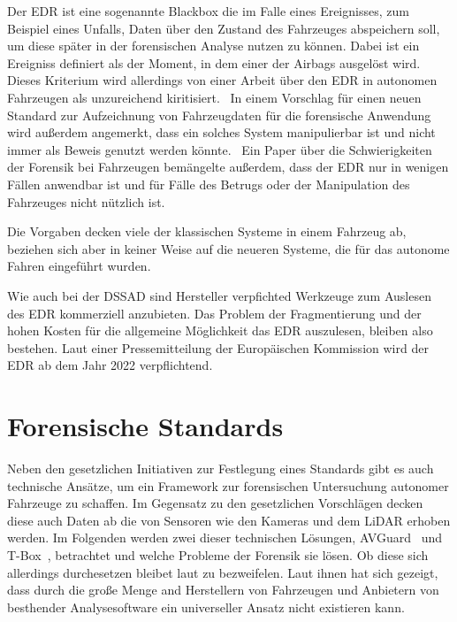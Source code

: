 \documentclass[conference,compsoc,final,a4paper]{IEEEtran}
\begin{document}
Der \ac{EDR} ist eine sogenannte Blackbox die im Falle eines Ereignisses, zum Beispiel eines Unfalls, Daten über den Zustand des Fahrzeuges abspeichern soll, um diese
später in der forensischen Analyse nutzen zu können.
Dabei ist ein Ereigniss definiert als der Moment, in dem einer der Airbags ausgelöst wird.~\cite{NHTSA_2018}
Dieses Kriterium wird allerdings von einer Arbeit über den EDR in autonomen Fahrzeugen als unzureichend kiritisiert.~\cite{Boehm2020}
In einem Vorschlag für einen neuen Standard zur Aufzeichnung von Fahrzeugdaten für die forensische Anwendung wird außerdem angemerkt,
dass ein solches System manipulierbar ist und nicht immer als Beweis genutzt werden könnte.~\cite{Lee_2019}
Ein Paper über die Schwierigkeiten der Forensik bei Fahrzeugen bemängelte außerdem, dass der \ac{EDR} nur in wenigen Fällen anwendbar ist
und für Fälle des Betrugs oder der Manipulation des Fahrzeuges nicht nützlich ist.~\cite{Kopencova_2020}

Die Vorgaben decken viele der klassischen Systeme in einem Fahrzeug ab, beziehen sich aber in keiner Weise auf die neueren Systeme, die für das autonome Fahren eingeführt wurden.

Wie auch bei der DSSAD sind Hersteller verpfichted Werkzeuge zum Auslesen des \ac{EDR} kommerziell anzubieten. Das Problem der Fragmentierung und der hohen Kosten für
die allgemeine Möglichkeit das \ac{EDR} auszulesen, bleiben also bestehen.
Laut einer Pressemitteilung der Europäischen Kommission wird der \ac{EDR} ab dem Jahr 2022 verpflichtend.~\cite{EuropeanCommision_2019}

\section{Forensische Standards}

Neben den gesetzlichen Initiativen zur Festlegung eines Standards gibt es auch technische Ansätze, um ein Framework zur forensischen
Untersuchung autonomer Fahrzeuge zu schaffen. Im Gegensatz zu den gesetzlichen Vorschlägen decken diese auch Daten ab die von Sensoren
wie den Kameras und dem \ac{LiDAR} erhoben werden.
Im Folgenden werden zwei dieser technischen Lösungen, AVGuard~\cite{Hoque_2021a} und T-Box~\cite{Lee_2019}, betrachtet und welche Probleme der Forensik sie lösen.
Ob diese sich allerdings durchesetzen bleibet laut \cite{Kopencova_2020} zu bezweifelen.
Laut ihnen
hat sich gezeigt, dass durch die große Menge and Herstellern von Fahrzeugen und Anbietern von besthender Analysesoftware
ein universeller Ansatz nicht existieren kann.
\end{document}
